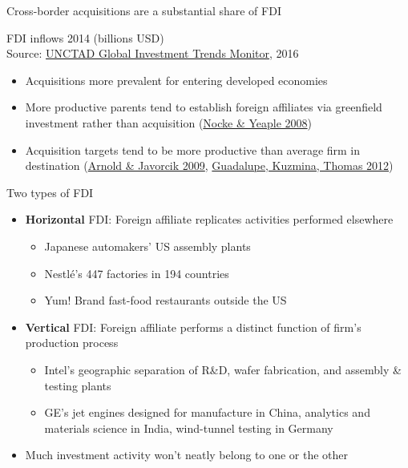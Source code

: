 \documentclass[11pt,notes=hide,aspectratio=169]{beamer}
\begin{document}
\begin{frame}{Cross-border acquisitions are a substantial share of FDI}
\vspace{-3mm}  
\begin{center}
\footnotesize{FDI inflows 2014 (billions USD)}
\resizebox{0.8\textwidth}{!}{}\\
\footnotesize{Source: \href{http://unctad.org/en/PublicationsLibrary/webdiaeia2016d1_en.pdf}{UNCTAD Global Investment Trends Monitor}, 2016}
\end{center}
\vspace{-3mm}
\begin{itemize}
	\item Acquisitions more prevalent for entering developed economies
	\item More productive parents tend to establish foreign affiliates via greenfield investment rather than acquisition {\footnotesize (\href{http://restud.oxfordjournals.org.proxy.uchicago.edu/content/75/2/529.abstract}{Nocke \& Yeaple 2008})}
	\item Acquisition targets tend to be more productive than average firm in destination {\footnotesize (\href{http://www.sciencedirect.com.proxy.uchicago.edu/science/article/pii/S0022199609000695}{Arnold \& Javorcik 2009}, \href{https://www-aeaweb-org.proxy.uchicago.edu/articles.php?doi=10.1257/aer.102.7.3594}{Guadalupe, Kuzmina, Thomas 2012})}
\end{itemize}
\end{frame}
\begin{frame}{Two types of FDI}
\begin{itemize}
	\item \textbf{Horizontal} FDI: Foreign affiliate replicates activities performed elsewhere
	\begin{itemize}
	\item Japanese automakers' US assembly plants
	\item Nestl\'{e}'s 447 factories in 194 countries
	\item Yum! Brand fast-food restaurants outside the US
	\end{itemize}
	\item \textbf{Vertical} FDI: Foreign affiliate performs a distinct function of firm's production process
	\begin{itemize}
	\item Intel's geographic separation of R\&D, wafer fabrication, and assembly \& testing plants
	\item GE's jet engines designed for manufacture in China, analytics and materials science in India, wind-tunnel testing in Germany
	\end{itemize}
	\item Much investment activity won't neatly belong to one or the other
\end{itemize}
\end{frame}
\end{document}
